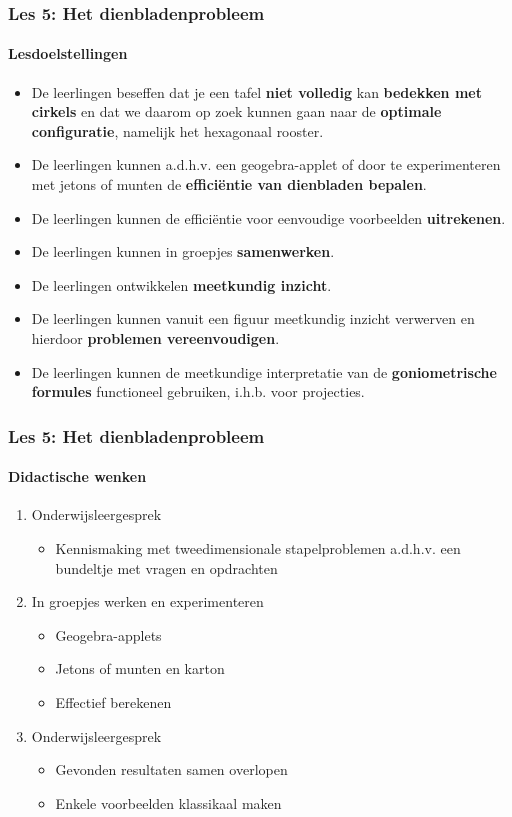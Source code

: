 \documentclass[dutch]{beamer}
\begin{document}
\begin{frame}
\frametitle{Les 5: Het dienbladenprobleem}
\framesubtitle{Lesdoelstellingen}
\begin{itemize}
\item De leerlingen beseffen dat je een tafel \textbf{niet volledig} kan \textbf{bedekken met cirkels} en dat we daarom op zoek kunnen gaan naar de \textbf{optimale configuratie}, namelijk het hexagonaal rooster.
\item De leerlingen kunnen a.d.h.v. een geogebra-applet of door te experimenteren met jetons of munten de \textbf{effici\"{e}ntie van dienbladen bepalen}.
\item De leerlingen kunnen de effici\"{e}ntie voor eenvoudige voorbeelden \textbf{uitrekenen}.
\item De leerlingen kunnen in groepjes \textbf{samenwerken}.
\item De leerlingen ontwikkelen \textbf{meetkundig inzicht}.
\item De leerlingen kunnen vanuit een figuur meetkundig inzicht verwerven en hierdoor \textbf{problemen vereenvoudigen}.
\item De leerlingen kunnen de meetkundige interpretatie van de \textbf{goniometrische formules} functioneel gebruiken, i.h.b. voor projecties.
\end{itemize}
\end{frame}

\begin{frame}
\frametitle{Les 5: Het dienbladenprobleem}
\framesubtitle{Didactische wenken}

\begin{enumerate}
	\item Onderwijsleergesprek
	\begin{itemize}
	\item Kennismaking met tweedimensionale stapelproblemen a.d.h.v. een bundeltje met vragen en opdrachten
\end{itemize}
	
	\item In groepjes werken en experimenteren 
	\begin{itemize}
	\item Geogebra-applets
	\item Jetons of munten en karton
	\item Effectief berekenen
\end{itemize}

  \item Onderwijsleergesprek
  \begin{itemize}
	\item Gevonden resultaten samen overlopen
	\item Enkele voorbeelden klassikaal maken
\end{itemize}
\end{enumerate}
\end{frame}
\end{document}
